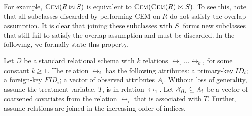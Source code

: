 



For example, ${\textsc{Cem}}(R \bowtie S)$ is equivalent to ${\textsc{Cem}}({\textsc{Cem}}(R)\bowtie S)$. 
To see this, note that all subclasses discarded by performing CEM on $R$ do not satisfy the overlap assumption. 
It is clear that joining these subclasses with $S$, forms new subclasses that still fail to satisfy the overlap assumption and
must be discarded. In the following, we formally state this property.


Let $D$ be a standard relational schema with $k$ relations
$\rel_1 \ldots \rel_k$, for some constant $k \geq 1$. The relation $\rel_i$
has the following attributes:  a  primary-key $ID_i $;  a foreign-key $FID_i $;   a vector of observed attributes
 $A_i$.  Without loss of generality, assume the treatment variable, $T$, is in relation $\rel_1$.  Let
  ${{\mathcal{X}}}_{{{R}}_i} \subseteq {A}_i$ be a vector of coarsened covariates from the relation $\rel_i$ that is associated with $T$.
    Further, assume relations are joined in the increasing order of indices.


